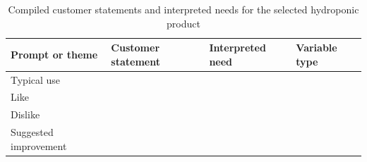 \begin{table}[htbp]
\centering
\caption{Compiled customer statements and interpreted needs for the selected hydroponic product}
\label{tab:session7-group-template}
\renewcommand{\arraystretch}{1.2}
\begin{tabularx}{\textwidth}{|>{\raggedright\arraybackslash}p{}|>{\raggedright\arraybackslash}X|>{\raggedright\arraybackslash}X|>{\raggedright\arraybackslash}p{}|}
\hline
\textbf{Prompt or theme} & \textbf{Customer statement} & \textbf{Interpreted need} & \textbf{Variable type} \\
\hline
Typical use &  &  &  \\
\hline
Like &  &  &  \\
\hline
Dislike &  &  &  \\
\hline
Suggested improvement &  &  &  \\
\hline
\end{tabularx}
\end{table}
